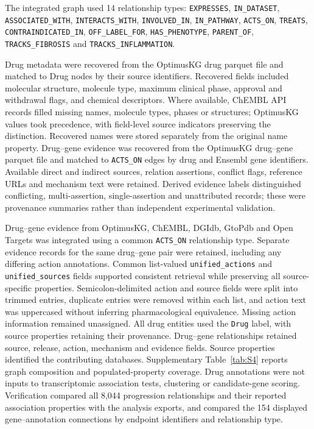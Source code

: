 \documentclass[11pt,a4paper]{article}
\begin{document}
\begingroup\raggedright
The integrated graph used 14 relationship types: \texttt{EXPRESSES}, \texttt{IN\_DATASET}, \texttt{ASSOCIATED\_WITH}, \texttt{INTERACTS\_WITH}, \texttt{INVOLVED\_IN}, \texttt{IN\_PATHWAY}, \texttt{ACTS\_ON}, \texttt{TREATS}, \texttt{CONTRAINDICATED\_IN}, \texttt{OFF\_LABEL\_FOR}, \texttt{HAS\_PHENOTYPE}, \texttt{PARENT\_OF}, \texttt{TRACKS\_FIBROSIS} and \texttt{TRACKS\_INFLAMMATION}.\par
\endgroup

Drug metadata were recovered from the OptimusKG drug parquet file and matched to Drug nodes by their source identifiers. Recovered fields included molecular structure, molecule type, maximum clinical phase, approval and withdrawal flags, and chemical descriptors. Where available, ChEMBL API records filled missing names, molecule types, phases or structures; OptimusKG values took precedence, with field-level source indicators preserving the distinction. Recovered names were stored separately from the original name property. Drug--gene evidence was recovered from the OptimusKG drug--gene parquet file and matched to \texttt{ACTS\_ON} edges by drug and Ensembl gene identifiers. Available direct and indirect sources, relation assertions, conflict flags, reference URLs and mechanism text were retained. Derived evidence labels distinguished conflicting, multi-assertion, single-assertion and unattributed records; these were provenance summaries rather than independent experimental validation.

Drug--gene evidence from OptimusKG, ChEMBL, DGIdb, GtoPdb and Open Targets was integrated using a common \texttt{ACTS\_ON} relationship type. Separate evidence records for the same drug--gene pair were retained, including any differing action annotations. Common list-valued \texttt{unified\_actions} and \texttt{unified\_sources} fields supported consistent retrieval while preserving all source-specific properties. Semicolon-delimited action and source fields were split into trimmed entries, duplicate entries were removed within each list, and action text was uppercased without inferring pharmacological equivalence. Missing action information remained unassigned. All drug entities used the \texttt{Drug} label, with source properties retaining their provenance. Drug--gene relationships retained source, release, action, mechanism and evidence fields. Source properties identified the contributing databases. Supplementary Table~\ref{tab:S4} reports graph composition and populated-property coverage. Drug annotations were not inputs to transcriptomic association tests, clustering or candidate-gene scoring. Verification compared all 8,044 progression relationships and their reported association properties with the analysis exports, and compared the 154 displayed gene--annotation connections by endpoint identifiers and relationship type.
\end{document}
